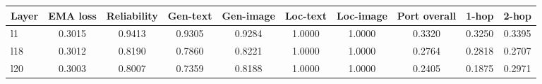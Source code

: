 \begin{tabular}{lccccccccc}
\toprule
Layer & EMA loss & Reliability & Gen-text & Gen-image & Loc-text & Loc-image & Port overall & 1-hop & 2-hop \\
\midrule
l1 & 0.3015 & 0.9413 & 0.9305 & 0.9284 & 1.0000 & 1.0000 & 0.3320 & 0.3250 & 0.3395 \\
l18 & 0.3012 & 0.8190 & 0.7860 & 0.8221 & 1.0000 & 1.0000 & 0.2764 & 0.2818 & 0.2707 \\
l20 & 0.3003 & 0.8007 & 0.7359 & 0.8188 & 1.0000 & 1.0000 & 0.2405 & 0.1875 & 0.2971 \\
\bottomrule
\end{tabular}
